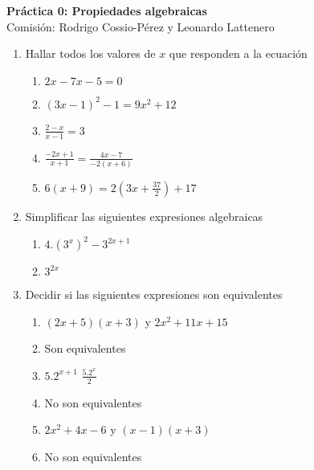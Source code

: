 \documentclass[a4paper]{article}
\newcommand{\answer}{\item[**]}
\newcommand{\exercise}{\item}
\begin{document}
\noindent \hrulefill 
\vspace{-7pt}
\begin{center} 
	\textbf{ Práctica 0: Propiedades algebraicas} \\
	Comisión: Rodrigo Cossio-Pérez y Leonardo Lattenero
\end{center}
\vspace{-10pt}
\hrulefill


\begin{enumerate}

	\exercise Hallar todos los valores de $x$ que responden a la ecuación
	\begin{enumerate} [label=(\alph*)]
		\item $2x-7x-5=0$
		
		\item $(3x-1)^2-1=9x^2+12$

		\item $\displaystyle\frac{2-x}{x-1}=3$

		\item $\displaystyle\frac{-2x+1}{x+1}=\displaystyle\frac{4x-7}{-2(x+6)}$

		\item $6(x+9)=2(3x+\displaystyle\frac{37}{2})+17$
	
	\end{enumerate}

	\exercise Simplificar las siguientes expresiones algebraicas
	\begin{enumerate} [label=(\alph*)]
		\item $4.\left(3^{x}\right)^{2}-3^{2x+1}$
		\answer $3^{2x}$
	
	\end{enumerate}


	\exercise Decidir si las siguientes expresiones son equivalentes
	\begin{enumerate} [label=(\alph*)]
		\item $(2x+5)(x+3)$ y $2x^2+11x+15$
		\answer Son equivalentes

		\item $5.2^{x+1}$ $\displaystyle\frac{5.2^{x}}{2}$
		\answer No son equivalentes
		
		\item $2x^2+4x-6$ y $(x-1)(x+3)$
		\answer No son equivalentes


\end{enumerate}
\end{enumerate}
\end{document}

